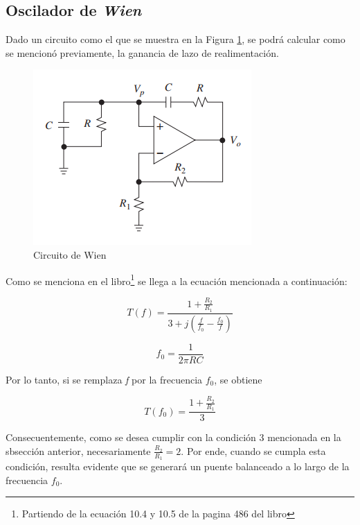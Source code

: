 \subsection{Oscilador de \emph{Wien}}

Dado un circuito como el que se muestra en la Figura \ref{1_1}, se
podrá calcular como se mencionó previamente, la ganancia de lazo de
realimentación. 

\begin{figure}[h]
\begin{centering}
\includegraphics{../Ex1/Resources/CircuitoWien.PNG}
\par\end{centering}
\caption{Circuito de Wien}
\label{1_1}

\end{figure}

Como se menciona en el libro\footnote{Partiendo de la ecuación 10.4 y 10.5 de la pagina 486 del libro}
se llega a la ecuación mencionada a continuación:

\begin{equation}
T(f)=\frac{1+\frac{R_{2}}{R_{1}}}{3+j\left(\frac{f}{f_{0}}-\frac{f_{0}}{f}\right)}\label{eq:1_1}
\end{equation}

\begin{equation}
f_{0}=\frac{1}{2\pi RC}\label{eq:1_1_1}
\end{equation}

Por lo tanto, si se remplaza \emph{f} por la frecuencia $f_{0}$,
se obtiene

\begin{equation}
T\left(f_{0}\right)=\frac{1+\frac{R_{2}}{R_{1}}}{3}\label{eq:1_2}
\end{equation}

Consecuentemente, como se desea cumplir con la condición 3 mencionada
en la sbsección anterior, necesariamente $\frac{R_{2}}{R_{1}}=2$.
Por ende, cuando se cumpla esta condición, resulta evidente que se
generará un puente balanceado a lo largo de la frecuencia $f_{0}$.

